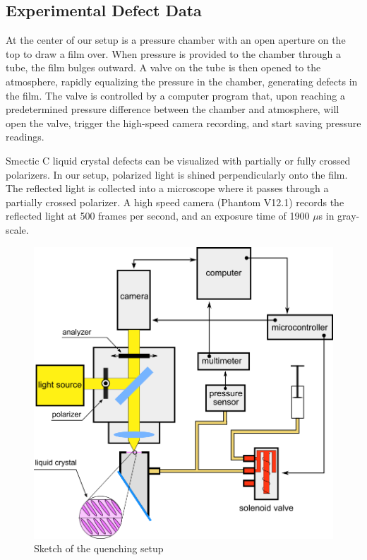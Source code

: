 \documentclass[prl,reprint,showpacs,floatfix,nofootinbib]{revtex4-1}
\begin{document}

\subsection{Experimental Defect Data}

At the center of our setup is a pressure chamber with an open aperture on the top to draw a film over. When pressure is provided to the chamber through a tube, the film bulges outward. A valve on the tube is then opened to the atmosphere, rapidly equalizing the pressure in the chamber, generating defects in the film. The valve is controlled by a computer program that, upon reaching a predetermined pressure difference between the chamber and atmosphere, will open the valve, trigger the high-speed camera recording, and start saving pressure readings. 


Smectic C liquid crystal defects can be visualized with partially or fully crossed polarizers. In our setup, polarized light is shined perpendicularly onto the film. The reflected light is collected into a microscope where it passes through a partially crossed polarizer. A high speed camera (Phantom V12.1) records the reflected light at 500 frames per second, and an exposure time of 1900 $\mu$s in gray-scale.

\begin{figure}
  \includegraphics[width=\linewidth]{quench-schematic.png}
  \caption{Sketch of the quenching setup}
  \label{fig:Setup Sketch}
\end{figure}
\end{document}
